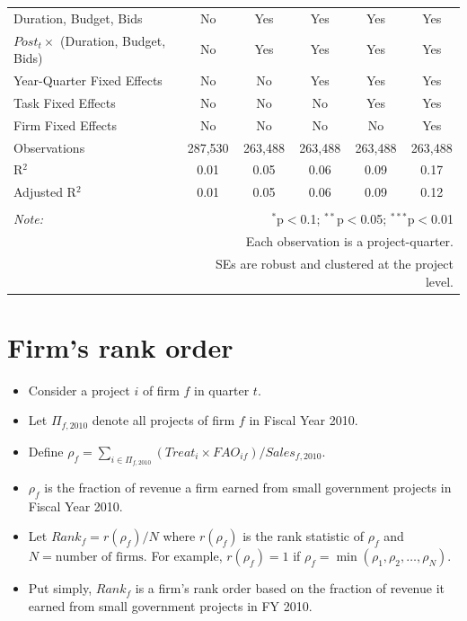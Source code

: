 \documentclass[
]{article}
\providecommand{\tightlist}{%
  \setlength{\itemsep}{0pt}\setlength{\parskip}{0pt}}
\begin{document}
\begin{table}[H]
\begin{tabular}{@{\extracolsep{-2pt}}lccccc}
Duration, Budget, Bids & No & Yes & Yes & Yes & Yes \\ 
$Post_t \times $  (Duration, Budget, Bids) & No & Yes & Yes & Yes & Yes \\ 
Year-Quarter Fixed Effects & No & No & Yes & Yes & Yes \\ 
Task Fixed Effects & No & No & No & Yes & Yes \\ 
Firm Fixed Effects & No & No & No & No & Yes \\ 
Observations & 287,530 & 263,488 & 263,488 & 263,488 & 263,488 \\ 
R$^{2}$ & 0.01 & 0.05 & 0.06 & 0.09 & 0.17 \\ 
Adjusted R$^{2}$ & 0.01 & 0.05 & 0.06 & 0.09 & 0.12 \\ 
\hline 
\hline \\[-1.8ex] 
\textit{Note:}  & \multicolumn{5}{r}{$^{*}$p$<$0.1; $^{**}$p$<$0.05; $^{***}$p$<$0.01} \\ 
 & \multicolumn{5}{r}{Each observation is a project-quarter.} \\ 
 & \multicolumn{5}{r}{SEs are robust and clustered at the project level.} \\ 
\end{tabular} 
\end{table}

\hypertarget{firms-rank-order}{%
\section{Firm's rank order}\label{firms-rank-order}}

\begin{itemize}
\tightlist
\item
  Consider a project \(i\) of firm \(f\) in quarter \(t\).
\item
  Let \(\Pi_{f,2010}\) denote all projects of firm \(f\) in Fiscal Year
  2010.
\item
  Define
  \(\rho_f = \sum_{i \in \Pi_{f,2010}} (Treat_i \times FAO_{if})/Sales_{f,\text{2010}}\).
\item
  \(\rho_f\) is the fraction of revenue a firm earned from small
  government projects in Fiscal Year 2010.
\item
  Let \(Rank_f = r(\rho_f)/N\) where \(r(\rho_f)\) is the rank statistic
  of \(\rho_{f}\) and \(N = \text{number of firms}.\) For example,
  \(r(\rho_f)=1\) if \(\rho_f=\min(\rho_1,\rho_2,\ldots,\rho_N)\).
\item
  Put simply, \(Rank_f\) is a firm's rank order based on the fraction of
  revenue it earned from small government projects in FY 2010.
\end{itemize}
\end{document}
